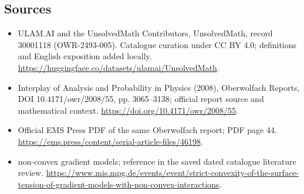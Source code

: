 \documentclass[11pt]{article}
\begin{document}
\subsection{Sources}
\begin{itemize}
\item[\hypertarget{source:30001118:1}{S1}] ULAM.AI and the UnsolvedMath Contributors, UnsolvedMath, record 30001118 (OWR-2493-005). Catalogue curation under CC BY 4.0; definitions and English exposition added locally.
\url{https://huggingface.co/datasets/ulamai/UnsolvedMath}.
\item[\hypertarget{source:30001118:2}{S2}] Interplay of Analysis and Probability in Physics (2008), Oberwolfach Reports, DOI 10.4171/owr/2008/55, pp. 3065--3138; official report source and mathematical context.
\url{https://doi.org/10.4171/owr/2008/55}.
\item[\hypertarget{source:30001118:3}{S3}] Official EMS Press PDF of the same Oberwolfach report; PDF page 44.
\url{https://ems.press/content/serial-article-files/46198}.
\item[\hypertarget{source:30001118:4}{S4}] non-convex gradient models; reference in the saved dated catalogue literature review.
\url{https://www.mis.mpg.de/events/event/strict-convexity-of-the-surface-tension-of-gradient-models-with-non-convex-interactions}.
\end{itemize}
\label{end:30001118}
\end{document}
